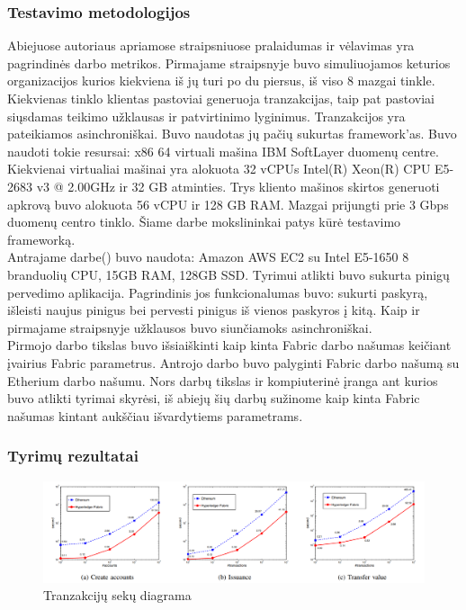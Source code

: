 \documentclass{VUMIFPSkursinis}
\begin{document}
		\subsubsection{Testavimo metodologijos}
			Abiejuose autoriaus apriamose straipsniuose pralaidumas ir vėlavimas yra pagrindinės darbo metrikos. Pirmajame straipsnyje \cite{IMBResearch}  buvo simuliuojamos keturios organizacijos kurios kiekviena iš jų turi po du piersus, iš viso 8 mazgai tinkle. Kiekvienas tinklo klientas pastoviai generuoja tranzakcijas, taip pat pastoviai siųsdamas teikimo užklausas ir patvirtinimo lyginimus. Tranzakcijos yra pateikiamos asinchroniškai. Buvo naudotas jų pačių sukurtas framework'as. Buvo naudoti tokie resursai: x86 64 virtuali mašina IBM SoftLayer duomenų centre. Kiekvienai virtualiai mašinai yra alokuota 32 vCPUs  Intel(R) Xeon(R)
CPU E5-2683 v3 @ 2.00GHz ir 32 GB atminties.  Trys kliento mašinos skirtos generuoti apkrovą buvo alokuota
 56 vCPU ir 128 GB RAM. Mazgai prijungti prie 3 Gbps duomenų centro tinklo. Šiame darbe mokslininkai patys kūrė testavimo frameworką. \\
Antrajame darbe(\cite{ThailandPerf}) buvo naudota: Amazon AWS EC2
 su Intel E5-1650 8 branduolių CPU,
15GB RAM, 128GB SSD. Tyrimui atlikti buvo sukurta pinigų pervedimo aplikacija. Pagrindinis jos funkcionalumas buvo: sukurti paskyrą, išleisti naujus pinigus bei pervesti pinigus iš vienos paskyros į kitą. Kaip ir pirmajame straipsnyje užklausos buvo siunčiamoks asinchroniškai. \\
Pirmojo darbo \cite{IBMResearch} tikslas buvo išsiaiškinti kaip kinta Fabric darbo našumas keičiant įvairius Fabric parametrus. Antrojo darbo \cite{ThailandPerf} 
buvo palyginti Fabric darbo našumą su Etherium darbo našumu. Nors darbų tikslas ir kompiuterinė įranga ant kurios buvo atlikti tyrimai skyrėsi, iš abiejų šių 
darbų sužinome kaip kinta Fabric našumas kintant aukščiau išvardytiems parametrams.
 



		\subsubsection{Tyrimų rezultatai}
\begin{figure}[H]
    \centering
    \includegraphics[scale=0.5]{img/TwoGreitis}
    \caption{Tranzakcijų sekų diagrama}   %
    \label{img:mlp}
\end{figure}		
\pagebreak
\end{document}
